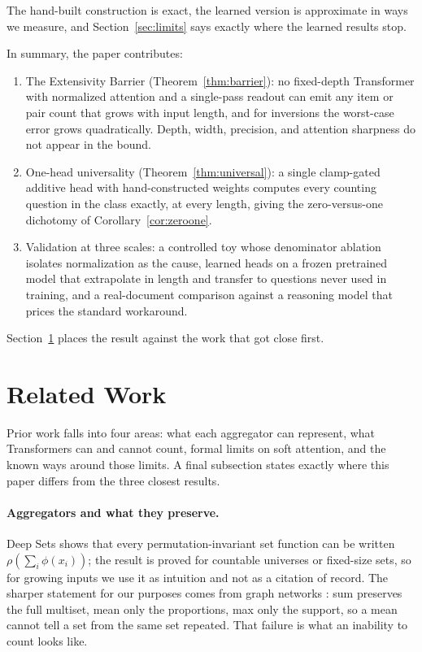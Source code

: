 \documentclass[10pt]{article}
\theoremstyle{definition}
\begin{document}
The hand-built construction is exact, the learned version is approximate
in ways we measure, and Section~\ref{sec:limits} says exactly where the
learned results stop.

In summary, the paper contributes:
\begin{enumerate}
\item The Extensivity Barrier (Theorem~\ref{thm:barrier}): no fixed-depth
  Transformer with normalized attention and a single-pass readout can emit
  any item or pair count that grows with input length, and for inversions
  the worst-case error grows quadratically. Depth, width, precision, and
  attention sharpness do not appear in the bound.
\item One-head universality (Theorem~\ref{thm:universal}): a single
  clamp-gated additive head with hand-constructed weights computes every
  counting question in the class exactly, at every length, giving the
  zero-versus-one dichotomy of Corollary~\ref{cor:zeroone}.
\item Validation at three scales: a controlled toy whose denominator
  ablation isolates normalization as the cause, learned heads on a frozen
  pretrained model that extrapolate in length and transfer to questions
  never used in training, and a real-document comparison against a
  reasoning model that prices the standard workaround.
\end{enumerate}

Section~\ref{sec:related} places the result against the work that got
close first.

\section{Related Work}
\label{sec:related}

Prior work falls into four areas: what each aggregator can represent, what
Transformers can and cannot count, formal limits on soft attention, and
the known ways around those limits. A final subsection states exactly
where this paper differs from the three closest results.

\paragraph{Aggregators and what they preserve.}

Deep Sets \citep{zaheer2017deepsets} shows that every permutation-invariant
set function can be written $\rho(\sum_i \phi(x_i))$; the result is proved
for countable universes or fixed-size sets, so for growing inputs we use it
as intuition and not as a citation of record. The sharper statement for our
purposes comes from graph networks \citep{xu2019gin}: sum preserves the
full multiset, mean only the proportions, max only the support, so a mean
cannot tell a set from the same set repeated. That failure is what an inability to count looks like.
\end{document}
